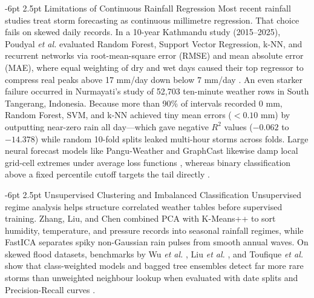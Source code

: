 \documentclass[10pt,twocolumn,a4paper]{article}
\makeatletter
\renewcommand{\subsection}{\@startsection{subsection}{2}{\z@}%
  {-6pt \@plus -1.5pt \@minus -0.5pt}%
  {2.5pt \@plus 0.5pt}%
  {\normalfont\normalsize\bfseries\itshape}}
\makeatother
\begin{document}
\subsection{Limitations of Continuous Rainfall Regression}
Most recent rainfall studies treat storm forecasting as continuous millimetre regression. That choice fails on skewed daily records. In a 10-year Kathmandu study (2015--2025), Poudyal \textit{et al.} \cite{ref1} evaluated Random Forest, Support Vector Regression, k-NN, and recurrent networks via root-mean-square error (RMSE) and mean absolute error (MAE), where equal weighting of dry and wet days caused their top regressor to compress real peaks above 17 mm/day down below 7 mm/day \cite{ref1,ref3}. An even starker failure occurred in Nurmayati's \cite{ref2} study of 52,703 ten-minute weather rows in South Tangerang, Indonesia. Because more than 90\% of intervals recorded 0 mm, Random Forest, SVM, and k-NN achieved tiny mean errors ($<0.10$ mm) by outputting near-zero rain all day---which gave negative $R^2$ values ($-0.062$ to $-14.378$) while random 10-fold splits leaked multi-hour storms across folds. Large neural forecast models like Pangu-Weather \cite{ref14} and GraphCast \cite{ref15} likewise damp local grid-cell extremes under average loss functions \cite{ref3}, whereas binary classification above a fixed percentile cutoff targets the tail directly \cite{ref16}.

\subsection{Unsupervised Clustering and Imbalanced Classification}
Unsupervised regime analysis helps structure correlated weather tables before supervised training. Zhang, Liu, and Chen \cite{ref17} combined PCA with K-Means++ to sort humidity, temperature, and pressure records into seasonal rainfall regimes, while FastICA separates spiky non-Gaussian rain pulses from smooth annual waves. On skewed flood datasets, benchmarks by Wu \textit{et al.} \cite{ref18}, Liu \textit{et al.} \cite{ref19}, and Toufique \textit{et al.} \cite{ref20} show that class-weighted models and bagged tree ensembles detect far more rare storms than unweighted neighbour lookup when evaluated with date splits and Precision-Recall curves \cite{ref2,ref3}.
\end{document}
